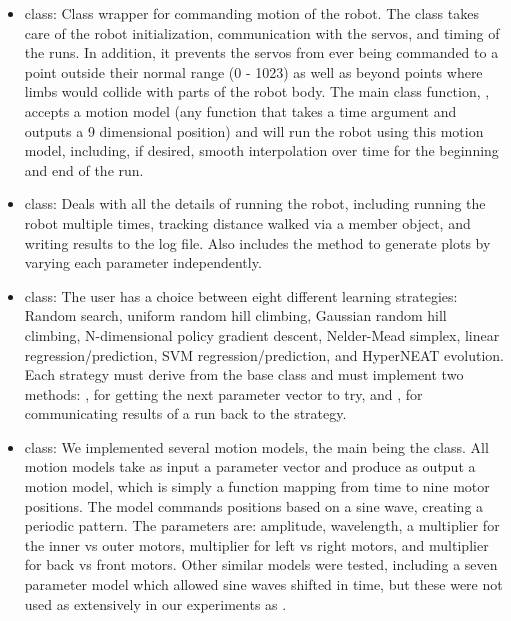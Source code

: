 \begin{itemize}

\item {} class: Class wrapper for commanding
  motion of the robot.  The  class takes care of the robot
  initialization, communication with the servos, and timing of the
  runs.  In addition, it prevents the servos from ever being commanded
  to a point outside their normal range (0 - 1023) as well as beyond
  points where limbs would collide with parts of the robot body.  The
  main class function, , accepts a motion model (any
  function that takes a time argument and outputs a 9 dimensional
  position) and will run the robot using this motion model, including,
  if desired, smooth interpolation over time for the beginning and end
  of the run.

\item {} class: Deals with all the details of running
  the robot, including running the robot multiple times, tracking
  distance walked via a  member object, and
  writing results to the log file. Also includes the
   method to generate plots by varying each
  parameter independently.

\item {} class: The user has a choice between eight
  different learning strategies: Random search, uniform random hill
  climbing, Gaussian random hill climbing, N-dimensional policy
  gradient descent, Nelder-Mead simplex, linear regression/prediction,
  SVM regression/prediction, and HyperNEAT evolution.  Each strategy
  must derive from the base  class and must implement
  two methods: , for getting the next parameter vector
  to try, and , for communicating results of a run
  back to the strategy.

\item {} class: We implemented several motion models,
  the main being the  class.  All motion models take
  as input a parameter vector and produce as output a motion model,
  which is simply a function mapping from time to nine motor
  positions.  The  model commands positions based on
  a sine wave, creating a periodic pattern. The parameters are:
  amplitude, wavelength, a multiplier for the inner vs outer motors,
  multiplier for left vs right motors, and multiplier for back vs
  front motors.  Other similar models were tested, including a seven
  parameter model which allowed sine waves shifted in time, but these
  were not used as extensively in our experiments as
  .


\end{itemize}

